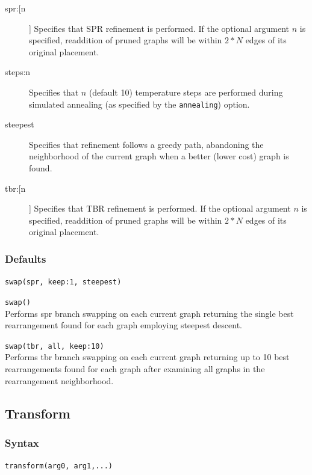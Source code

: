 \begin{description}
			\item[spr:[n]] Specifies that SPR refinement \citep{Dayhoff1969} is performed. If the optional 
			argument $n$ is specified, readdition of pruned graphs will be within $2 * N$ edges of its original 
			placement.
		
			\item[steps:n] Specifies that $n$ (default 10) temperature steps are performed during simulated 
			annealing (as specified by the \texttt{annealing}) option.
		
			\item[steepest] Specifies that refinement follows a greedy path, abandoning the neighborhood 
			of the current graph when a better (lower cost) graph is found.
		
			\item[tbr:[n]] Specifies that TBR refinement \citep{Farris1988, swofford1990a} is performed. If the 
			optional argument $n$ is specified, readdition of pruned graphs will be within $2 * N$ edges of its 
			original placement.
		\end{description}	
		
		\subsubsection{Defaults}
			\texttt{swap(spr, keep:1, steepest)}
		
		\begin{example}
			\item{\texttt{swap()}\\Performs spr branch swapping on each current graph returning the single 
			best rearrangement found for each graph employing steepest descent.}
			
			\item{\texttt{swap(tbr, all, keep:10)}\\Performs tbr branch swapping on each current graph 
			returning up to 10 best rearrangements found for each graph after examining all graphs in 
			the rearrangement neighborhood.}
		\end{example}
		
\subsection{Transform}
	\subsubsection{Syntax}
		\texttt{transform(arg0, arg1,...)}
			
